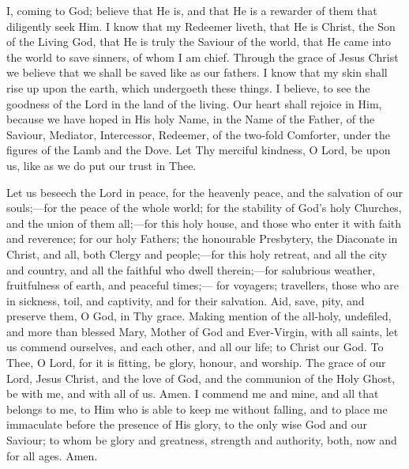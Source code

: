 
I, coming to God; believe that He is, and that He is a rewarder of them that diligently seek Him. I know that my Redeemer liveth, that He is Christ, the Son of the Living God, that He is truly the Saviour of the world,  that He came into the world to save sinners, of whom I am chief. Through the grace of Jesus Christ we believe that we shall be saved like as our fathers. I know that my skin shall rise up upon the earth, which undergoeth these things. I believe, to see the goodness of the Lord in the land of the living. Our heart shall rejoice in Him, because we have hoped in His holy Name, in the Name of the Father, of the Saviour, Mediator, Intercessor, Redeemer, of the two‑fold Comforter, under the figures of the Lamb and the Dove. Let Thy merciful kindness, O Lord, be upon us, like as we do put our trust in Thee.


Let us beseech the Lord in peace, for the heavenly peace, and the salvation of our souls;—for the peace of the whole world; for the stability of God’s holy Churches, and the union of them all;—for this holy house, and those who enter it with faith and reverence; for our holy Fathers; the honourable Presbytery, the Diaconate in Christ, and all, both Clergy and people;—for this holy retreat, and all the city and country, and all the faithful who dwell therein;—for salubrious weather, fruitfulness of earth, and peaceful times;— for voyagers; travellers, those who are in sickness, toil, and captivity, and for their salvation.  Aid, save, pity, and preserve them, O God, in Thy grace. Making mention  of the all‑holy, undefiled, and more than blessed Mary, Mother of God and Ever‑Virgin, with all saints, let us commend ourselves, and each other, and all our life; to Christ our God. To Thee, O Lord, for it is fitting, be glory, honour, and worship. The grace of our Lord, Jesus Christ, and the love of God, and the communion of the Holy Ghost, be with me, and with all of us. Amen. I commend me and mine, and all that belongs to me, to Him who is able to keep me without falling, and to place me immaculate before the presence of His glory, to the only wise God and our Saviour; to whom be glory and greatness, strength and authority, both, now and for all ages. Amen.


